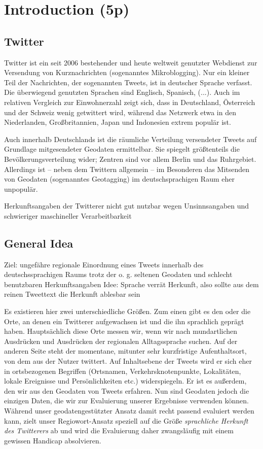 \documentclass[../Main.tex]{subfiles}
\begin{document}
\section{Introduction (5p)}
\subsection{Twitter} %
Twitter ist ein seit 2006 bestehender und heute weltweit genutzter Webdienst zur Versendung von Kurznachrichten (sogenanntes Mikroblogging). Nur ein kleiner Teil der Nachrichten, der sogenannten Tweets, ist in deutscher Sprache verfasst. Die überwiegend genutzten Sprachen sind Englisch, Spanisch, (...). Auch im relativen Vergleich zur Einwohnerzahl zeigt sich, dass in Deutschland, Österreich und der Schweiz wenig getwittert wird, während das Netzwerk etwa in den Niederlanden, Großbritannien, Japan und Indonesien extrem populär ist.

Auch innerhalb Deutschlands ist die räumliche Verteilung versendeter Tweets auf Grundlage mitgesendeter Geodaten ermittelbar. Sie spiegelt größtenteils die Bevölkerungsverteilung wider; Zentren sind vor allem Berlin und das Ruhrgebiet. Allerdings ist -- neben dem Twittern allgemein -- im Besonderen das Mitsenden von Geodaten (sogenanntes Geotagging) im deutschsprachigen Raum eher unpopulär.

Herkunftsangaben der Twitterer nicht gut nutzbar wegen Unsinnsangaben und schwieriger maschineller Verarbeitbarkeit %

\subsection{General Idea}
Ziel: ungefähre regionale Einordnung eines Tweets innerhalb des deutschssprachigen Raums trotz der o. g. seltenen Geodaten und schlecht benutzbaren Herkunftsangaben %
Idee: Sprache verrät Herkunft, also sollte aus dem reinen Tweettext die Herkunft ablesbar sein %

Es existieren hier zwei unterschiedliche Größen. Zum einen gibt es den oder die Orte, an denen ein Twitterer aufgewachsen ist und die ihn sprachlich geprägt haben. Hauptsächlich diese Orte messen wir, wenn wir nach mundartlichen Ausdrücken und Ausdrücken der regionalen Alltagssprache suchen. Auf der anderen Seite steht der momentane, mitunter sehr kurzfristige Aufenthaltsort, von dem aus der Nutzer twittert. Auf Inhaltsebene der Tweets wird er sich eher in ortsbezogenen Begriffen (Ortsnamen, Verkehrsknotenpunkte, Lokalitäten, lokale Ereignisse und Persönlichkeiten etc.) widerspiegeln. Er ist es außerdem, den wir aus den Geodaten von Tweets erfahren. Nun sind Geodaten jedoch die einzigen Daten, die wir zur Evaluierung unserer Ergebnisse verwenden können. Während unser geodatengestützter Ansatz damit recht passend evaluiert werden kann, zielt unser Regiowort-Ansatz speziell auf die Größe \textit{sprachliche Herkunft des Twitterers} ab und wird die Evaluierung daher zwangsläufig mit einem gewissen Handicap absolvieren.
\end{document}

